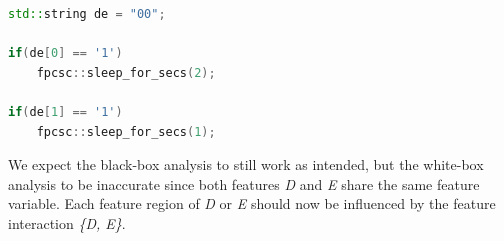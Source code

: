 \begin{minipage}{\linewidth}
\begin{lstlisting}[language=C++,label={lst:shared},escapechar=|]
std::string de = "00";

if(de[0] == '1')
    fpcsc::sleep_for_secs(2);

if(de[1] == '1')
    fpcsc::sleep_for_secs(1);
\end{lstlisting}
\end{minipage}

We expect the black-box analysis to still work as intended, but the white-box analysis to be inaccurate since both features \emph{D} and \emph{E} share the same feature variable. 
Each feature region of \emph{D} or \emph{E} should now be influenced by the feature interaction \emph{\{D, E\}}.